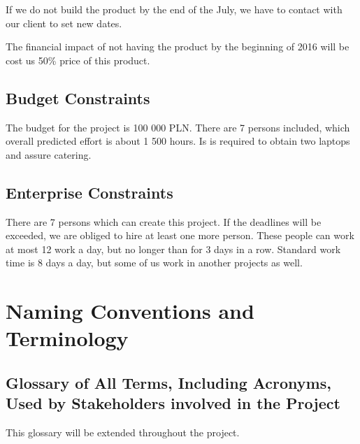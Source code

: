 \documentclass[a4paper,10pt]{report}
\begin{document}
If we do not build the product by the end of the July, we have to contact with our client to set new dates.  

The financial impact of not having the product by the beginning of 2016 will be cost us 50\% price of this product.

\subsection{Budget Constraints}

The budget for the project is 100 000 PLN. There are 7 persons included, which overall predicted effort is about 1 500 hours. Is is required to obtain two laptops and assure catering.

\subsection{Enterprise Constraints}

There are 7 persons which can create this project. If the deadlines will be exceeded, we are obliged to hire at least one more person. These people can work at most 12 work a day, but no longer than for 3 days in a row. Standard work time is 8 days a day, but some of us work in another projects as well.


\section{Naming Conventions and Terminology}
\subsection{Glossary of All Terms, Including Acronyms, Used by Stakeholders involved in the Project}
This glossary will be extended throughout the project.
\end{document}
